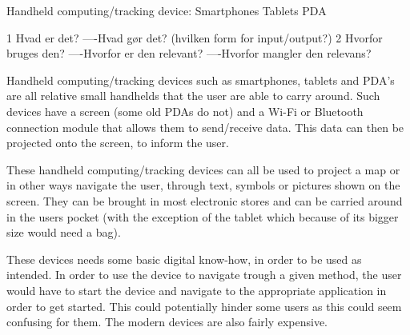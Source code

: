  Handheld computing/tracking device:
 	 Smartphones
 	 Tablets
 	 PDA
 	 
 	 
 	 1 Hvad er det?
 	 ----Hvad gør det? (hvilken form for input/output?)
 	 2 Hvorfor bruges den?
 	 ----Hvorfor er den relevant?
 	 ----Hvorfor mangler den relevans?
 	 
Handheld computing/tracking devices such as smartphones, tablets and PDA's are all relative small handhelds that the user are able to carry around. Such devices have a screen (some old PDAs do not) and a Wi-Fi or Bluetooth connection module that allows them to send/receive data. This data can then be projected onto the screen, to inform the user.


These handheld computing/tracking devices can all be used to project a map or in other ways navigate the user, through text, symbols or pictures shown on the screen. They can be brought in most electronic stores and can be carried around in the users pocket (with the exception of the tablet which because of its bigger size would need a bag). 

These devices needs some basic digital know-how, in order to be used as intended. In order to use the device to navigate trough a given method, the user would have to start the device and navigate to the appropriate application in order to get started. This could potentially hinder some users as this could seem confusing for them. The modern devices are also fairly expensive. 